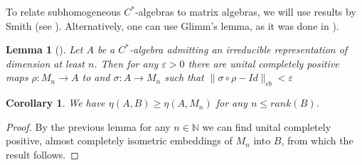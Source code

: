 \documentclass[11pt]{article}
\numberwithin{theorem}{section}
\newtheorem{lemma}[theorem]{Lemma}
\newtheorem{corollary}[theorem]{Corollary}
\begin{document}
To relate subhomogeneous $C^{\ast}$-algebras to matrix algebras, we will use results by Smith (see \cite[Lemma 2.7]{Smithcb}). Alternatively, one can use Glimm's lemma, as it was done in \cite[Lemma 3.9]{MusatRordam}).
\begin{lemma}[{\cite[Lemma 2.7]{Smithcb}}]\label{lem:smithfactorization}
Let $A$ be a $C^{\ast}$-algebra admitting an irreducible representation of dimension at least $n$. Then for any $\varepsilon > 0$ there are unital completely positive maps $\rho: M_n \to A$ to and $\sigma: A \to M_n$ such that $\|\sigma \circ \rho - Id\|_{cb} < \varepsilon$
\end{lemma}
\begin{corollary}\label{cor:etaestimate}
We have $\eta(A,B) \geqslant \eta(A, M_{n})$ for any $n \leqslant rank(B)$.    
\end{corollary}
\begin{proof}
By the previous lemma for any $n \in \mathbb{N}$ we can find unital completely positive, almost completely isometric embeddings of $M_n$ into $B$, from which the result follows.
\end{proof}
\end{document}
